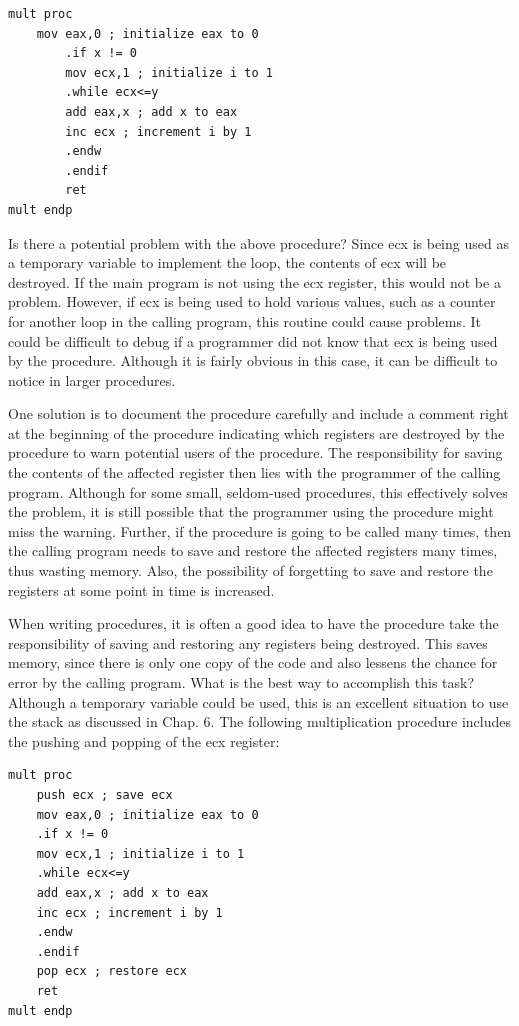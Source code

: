 \documentclass[10pt]{book}
\begin{document}
\begin{center}
\begin{center}
\begin{verbatim}
mult proc
    mov eax,0 ; initialize eax to 0
        .if x != 0
        mov ecx,1 ; initialize i to 1
        .while ecx<=y
        add eax,x ; add x to eax
        inc ecx ; increment i by 1
        .endw
        .endif
        ret
mult endp
\end{verbatim}

Is there a potential problem with the above procedure? Since ecx is being used as a temporary variable to implement the loop, the contents of ecx will be destroyed. If the main program is not using the ecx register, this would not be a problem. However, if ecx is being used to hold various values, such as a counter for another loop in the calling program, this routine could cause problems. It could be difficult to debug if a programmer did not know that ecx is being used by the procedure. Although it is fairly obvious in this case, it can be difficult to notice in larger procedures.

One solution is to document the procedure carefully and include a comment right at the beginning of the procedure indicating which registers are destroyed by the procedure to warn potential users of the procedure. The responsibility for saving the contents of the affected register then lies with the programmer of the calling program. Although for some small, seldom-used procedures, this effectively solves the problem, it is still possible that the programmer using the procedure might miss the warning. Further, if the procedure is going to be called many times, then the calling program needs to save and restore the affected registers many times, thus wasting memory. Also, the possibility of forgetting to save and restore the registers at some point in time is increased.

When writing procedures, it is often a good idea to have the procedure take the responsibility of saving and restoring any registers being destroyed. This saves memory, since there is only one copy of the code and also lessens the chance for error by the calling program. What is the best way to accomplish this task? Although a temporary variable could be used, this is an excellent situation to use the stack as discussed in Chap. 6. The following multiplication procedure includes the pushing and popping of the ecx register:

\begin{verbatim}
mult proc
    push ecx ; save ecx
    mov eax,0 ; initialize eax to 0
    .if x != 0
    mov ecx,1 ; initialize i to 1
    .while ecx<=y
    add eax,x ; add x to eax
    inc ecx ; increment i by 1
    .endw
    .endif
    pop ecx ; restore ecx
    ret
mult endp
\end{verbatim}


\end{center}
\end{center}
\end{document}
